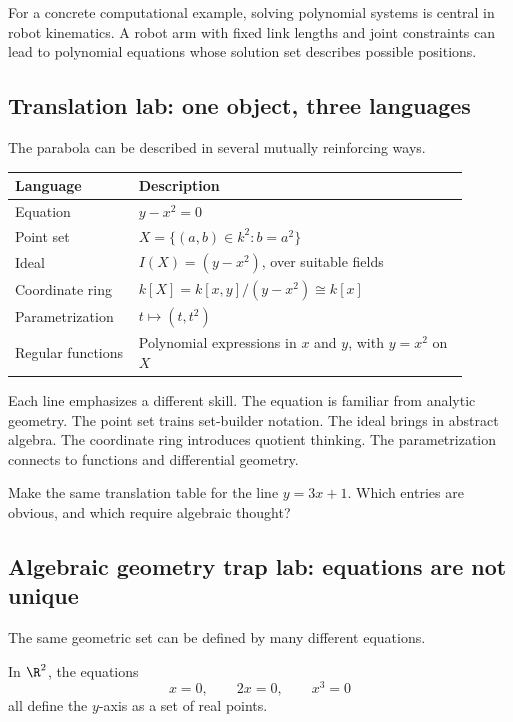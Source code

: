 For a concrete computational example, solving polynomial systems is central in
robot kinematics. A robot arm with fixed link lengths and joint constraints can
lead to polynomial equations whose solution set describes possible positions.

\subsection{Translation lab: one object, three languages}

The parabola can be described in several mutually reinforcing ways.

\begin{longtable}{p{0.24\linewidth}p{0.66\linewidth}}
\toprule
Language & Description \\
\midrule
Equation & $y-x^2=0$ \\
Point set & $X=\{(a,b)\in k^2:b=a^2\}$ \\
Ideal & $I(X)=(y-x^2)$, over suitable fields \\
Coordinate ring & $k[X]=k[x,y]/(y-x^2)\cong k[x]$ \\
Parametrization & $t\mapsto(t,t^2)$ \\
Regular functions & Polynomial expressions in $x$ and $y$, with $y=x^2$ on $X$ \\
\bottomrule
\end{longtable}

Each line emphasizes a different skill. The equation is familiar from analytic
geometry. The point set trains set-builder notation. The ideal brings in
abstract algebra. The coordinate ring introduces quotient thinking. The
parametrization connects to functions and differential geometry.

\begin{labbox}
Make the same translation table for the line $y=3x+1$. Which entries are
obvious, and which require algebraic thought?
\end{labbox}

\subsection{Algebraic geometry trap lab: equations are not unique}

The same geometric set can be defined by many different equations.

\begin{example}
In $\R^2$, the equations
\[
x=0,\qquad 2x=0,\qquad x^3=0
\]
all define the $y$-axis as a set of real points.
\end{example}

